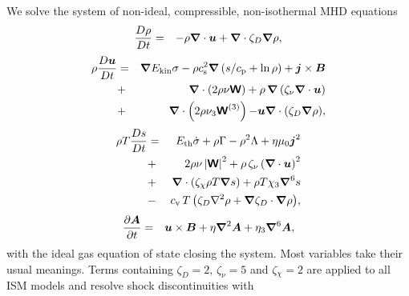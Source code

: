 \documentclass[preprint2]{aastex63}
\newcommand\ESK{E_{\rm kin}}
\newcommand\EST{E_{\rm th}}
\newcommand{\vect}[1]{{{\mbox{\boldmath $#1$}}}}%
\newcommand{\mathbfss}[1]{\textbf{\textsf{#1}}}
\begin{document}
 We solve the system of non-ideal, compressible, non-isothermal MHD equations
  \begin{eqnarray}
  \label{eq:mass}
    \frac{D\rho}{Dt} &=& 
    -\rho \vect\nabla \cdot \vect{u}
    +\vect\nabla \cdot\zeta_D\vect\nabla\rho,
  \end{eqnarray}
  \begin{eqnarray}
  \label{eq:mom}
    \rho\frac{D\vect{u}}{Dt} &=& 
    \vect\nabla{\ESK\sigma}
    -\rho c_{\rm s}^2\vect\nabla\left({s}/{c_{\rm p}}+\ln\rho\right)
    +\vect{j}\times\vect{B}
    \nonumber\\
    &+&\vect\nabla\cdot \left(2\rho\nu{\mathbfss W}\right)
    +\rho\,\vect\nabla\left(\zeta_{\nu}\vect\nabla \cdot \vect{u} \right)
    \nonumber\\
    &+&\vect\nabla\cdot \left(2\rho\nu_3{\mathbfss W}^{(3)}\right)
  {-\vect u\vect{\nabla}\cdot\left(\zeta_D\vect{\nabla}\rho\right)},
  \end{eqnarray}
  \begin{eqnarray}
  \label{eq:ent}
    \rho T\frac{D s}{Dt} &=&
     \EST\dot\sigma +\rho\Gamma
    -\rho^2\Lambda +\eta\mu_0\vect{j}^2 
    \nonumber\\
    &+&2 \rho \nu\left|{\mathbfss W}\right|^{2}
    +\rho\,\zeta_{\nu}\left(\vect\nabla \cdot \vect{u} \right)^2
    \nonumber\\
    &+&\vect\nabla\cdot\left(\zeta_\chi\rho T\vect\nabla s\right)
    +\rho T\chi_3\vect\nabla^6 s
    \nonumber\\
    &-& {c_{\rm{v}}\,T \left(
    \zeta_D\nabla^2\rho + \vect\nabla\zeta_D\cdot\vect\nabla\rho\right)},
  \end{eqnarray}
  \begin{eqnarray}
  \label{eq:ind}
    \frac{\partial \vect{A}}{\partial t} &=&
    \vect{u}\times\vect{B}
    +\eta\vect\nabla^2\vect{A}
    +\eta_3\vect\nabla^6\vect{A},
  \end{eqnarray}
 with the ideal gas equation of state closing the system.
 Most variables take their usual meanings.
 Terms containing $\zeta_D{=2},\,\zeta_\nu{=5}$ and $\zeta{_\chi=2}$
 {are applied to all ISM models and} resolve shock discontinuities with
\end{document}
